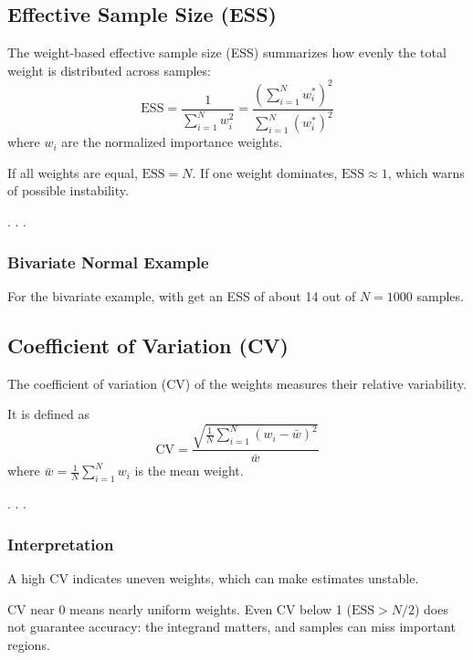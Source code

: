 \documentclass[
  letterpaper,
  DIV=11,
  numbers=noendperiod]{scrartcl}
\begin{document}

\subsection{Effective Sample Size
(ESS)}\label{effective-sample-size-ess-1}

The weight-based effective sample size (ESS) summarizes how evenly the
total weight is distributed across samples: \[
  \mathrm{ESS}
  = \frac{1}{\sum_{i=1}^N w_i^2}
  = \frac{\left( \sum_{i=1}^N w^*_i \right)^2}{\sum_{i=1}^N ({w^*_i})^2}
\] where \(w_i\) are the \alert{normalized} importance weights.

\medskip\pause

If all weights are equal, \(\mathrm{ESS} = N\). If one weight dominates,
\(\mathrm{ESS} \approx 1\), which warns of possible instability.

. . .

\subsubsection{Bivariate Normal Example}\label{bivariate-normal-example}

For the bivariate example, with get an ESS of about 14 out of
\(N = 1000\) samples.

\subsection{Coefficient of Variation
(CV)}\label{coefficient-of-variation-cv-1}

The coefficient of variation (CV) of the weights measures their relative
variability.

\medskip\pause

It is defined as \[
  \mathrm{CV}
  = \frac{\sqrt{\frac{1}{N} \sum_{i=1}^N (w_i - \bar{w})^2}}{\bar{w}}
\] where \(\bar{w} = \frac{1}{N} \sum_{i=1}^N w_i\) is the mean weight.

. . .

\subsubsection{Interpretation}\label{interpretation}

A high CV indicates uneven weights, which can make estimates unstable.

\medskip\pause

CV near 0 means nearly uniform weights. Even CV below 1
(\(\mathrm{ESS} > N/2\)) does not guarantee accuracy: the integrand
matters, and samples can miss important regions.
\end{document}
